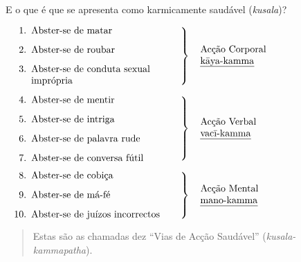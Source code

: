E o que é que se apresenta como karmicamente saudável (\emph{kusala})?

\bigskip

$\left.
\begin{minipage}{0.52\linewidth}
\raggedright
\begin{enumerate}
  \item Abster-se de matar
  \item Abster-se de roubar
  \item Abster-se de conduta sexual imprópria
\end{enumerate}
\end{minipage}
\right\}
\hspace*{10pt}\parbox{0.4\linewidth}{Acção Corporal\\ \emph{kāya-kamma}}
$

\bigskip

$\left.
\begin{minipage}{0.52\linewidth}
\raggedright
\begin{enumerate}
\setcounter{enumi}{3}
  \item Abster-se de mentir
  \item Abster-se de intriga
  \item Abster-se de palavra rude
  \item Abster-se de conversa fútil
\end{enumerate}
\end{minipage}
\right\}
\hspace*{10pt}\parbox{0.4\linewidth}{Acção Verbal\\ \emph{vacī-kamma}}
$

\bigskip

$\left.
\begin{minipage}{0.52\linewidth}
\raggedright
\begin{enumerate}
\setcounter{enumi}{7}
  \item Abster-se de cobiça
  \item Abster-se de má-fé
  \item Abster-se de juízos incorrectos
\end{enumerate}
\end{minipage}
\right\}
\hspace*{10pt}\parbox{0.4\linewidth}{Acção Mental\\ \emph{mano-kamma}}
$


\begin{quote}
  Estas são as chamadas dez “Vias de Acção Saudável” (\emph{kusala-kammapatha}).
\end{quote}

